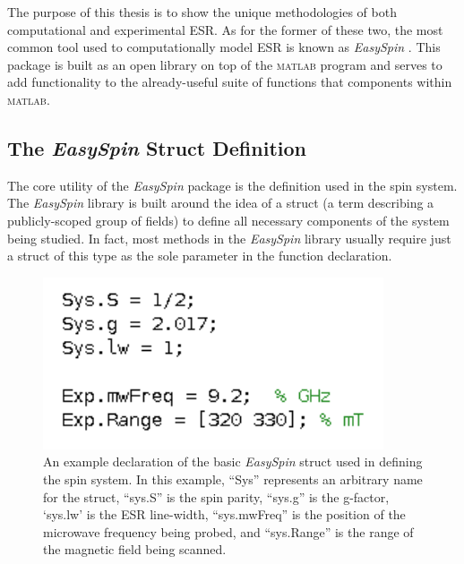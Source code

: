 \documentclass[oneside]{BYUPhys}
\begin{document}
The purpose of this thesis is to show the unique methodologies of both computational and experimental ESR. As for the former of these two, the most common tool used to computationally model ESR is known as \textit{EasySpin} \cite{RefWorks:doc:58929a02e4b0d4c09201f91b}. This package is built as an open library on top of the \textsc{matlab} program and serves to add functionality to the already-useful suite of functions that components within \textsc{matlab}.

\subsection{The \textit{EasySpin} Struct Definition}

The core utility of the \textit{EasySpin} package is the definition used in the spin system. The \textit{EasySpin} library is built around the idea of a struct (a term describing a publicly-scoped group of fields) to define all necessary components of the system being studied. In fact, most methods in the \textit{EasySpin} library usually require just a struct of this type as the sole parameter in the function declaration.

\begin{figure}[h]
    \centerline{\includegraphics{example_params_fig}}
    \caption[Simple Spin System Definition]{\label{fig:SpinDefinition}
     An example declaration of the basic \textit{EasySpin} struct used in defining the spin system. In this example, ``Sys'' represents an arbitrary name for the struct, ``sys.S'' is the spin parity, ``sys.g'' is the g-factor, `sys.lw' is the ESR line-width, ``sys.mwFreq'' is the position of the microwave frequency being probed, and ``sys.Range'' is the range of the magnetic field being scanned.}
 \end{figure}
\end{document}
